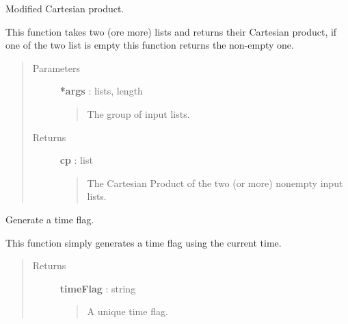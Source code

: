 \documentclass[letterpaper,10pt,english]{sphinxmanual}
\begin{document}
\begin{fulllineitems}
\label{index:adenine.utils.extra.modified_cartesian}
Modified Cartesian product.

This function takes two (ore more) lists and returns their Cartesian product, if one of the two list is empty this function returns the non-empty one.
\begin{quote}\begin{description}
\item[{Parameters}] \leavevmode
\textbf{*args} : lists, length
\begin{quote}

The group of input lists.
\end{quote}

\item[{Returns}] \leavevmode
\textbf{cp} : list
\begin{quote}

The Cartesian Product of the two (or more) nonempty input lists.
\end{quote}

\end{description}\end{quote}

\end{fulllineitems}


\begin{fulllineitems}
\label{index:adenine.utils.extra.make_time_flag}
Generate a time flag.

This function simply generates a time flag using the current time.
\begin{quote}\begin{description}
\item[{Returns}] \leavevmode
\textbf{timeFlag} : string
\begin{quote}

A unique time flag.
\end{quote}

\end{description}\end{quote}

\end{fulllineitems}

\end{document}
